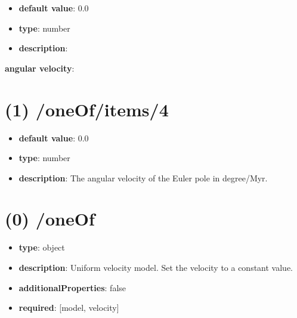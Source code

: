 \begin{itemize}[leftmargin=2em]\item {\bf default value}: 0.0
\item {\bf type}: number
\item {\bf description}: 
\end{itemize}\item {\bf angular velocity}: \section{(1) /oneOf/items/4}
\begin{itemize}[leftmargin=1em]\item {\bf default value}: 0.0
\item {\bf type}: number
\item {\bf description}: The angular velocity of the Euler pole in degree/Myr.
\end{itemize}\section{(0) /oneOf}
\begin{itemize}[leftmargin=0em]\item {\bf type}: object
\item {\bf description}: Uniform velocity model. Set the velocity to a constant value.
\item {\bf additionalProperties}: false
\item {\bf required}: [model, velocity]\end{itemize}
